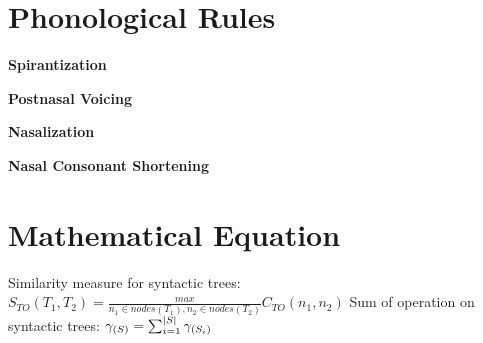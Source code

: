 \documentclass{article}
\begin{document}
\section{Phonological Rules}
\newline
\textbf{Spirantization}

\newline
{}
\newline
\newline
\textbf{Postnasal Voicing}

\newline
\newline
{}
\newline
\newline
\textbf{Nasalization}

\newline
\newline
{}
\newline
\newline
\textbf{Nasal Consonant Shortening}

\newline
\newline
{}

\section{Mathematical Equation}
\newline
\newline
Similarity measure for syntactic trees:
\newline
\newline
\begin{math}
S_{TO}(T_{1},T_{2}) = \frac{max}{n_{1} \in nodes(T_{1}),n_{2} \in nodes(T_{2})}C_{TO}(n_{1},n_{2})
\end{math}
\newline
\newline
Sum of operation on syntactic trees:
\newline
\begin{math}

\noindent \gamma_{(S)} = \sum_{i=1}^{|S|} \gamma_{(S_{i})} 
\end{math}
\newline
\end{document}
